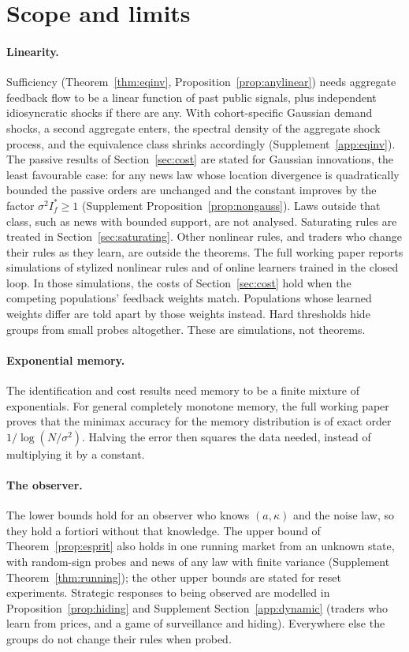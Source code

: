 \section{Scope and limits}\label{sec:scope}

\paragraph{Linearity.} Sufficiency (Theorem~\ref{thm:eqinv}, Proposition~\ref{prop:anylinear}) needs aggregate feedback flow to be a linear function of past public signals, plus independent idiosyncratic shocks if there are any. With cohort-specific Gaussian demand shocks, a second aggregate enters, the spectral density of the aggregate shock process, and the equivalence class shrinks accordingly (Supplement~\ref{app:eqinv}). The passive results of Section~\ref{sec:cost} are stated for Gaussian innovations, the least favourable case: for any news law whose location divergence is quadratically bounded the passive orders are unchanged and the constant improves by the factor $\sigma^2I^*_f\ge1$ (Supplement Proposition~\ref{prop:nongauss}). Laws outside that class, such as news with bounded support, are not analysed. Saturating rules are treated in Section~\ref{sec:saturating}. Other nonlinear rules, and traders who change their rules as they learn, are outside the theorems. The full working paper reports simulations of stylized nonlinear rules and of online learners trained in the closed loop. In those simulations, the costs of Section~\ref{sec:cost} hold when the competing populations' feedback weights match. Populations whose learned weights differ are told apart by those weights instead. Hard thresholds hide groups from small probes altogether. These are simulations, not theorems.

\paragraph{Exponential memory.} The identification and cost results need memory to be a finite mixture of exponentials. For general completely monotone memory, the full working paper proves that the minimax accuracy for the memory distribution is of exact order $1/\log(N/\sigma^2)$. Halving the error then squares the data needed, instead of multiplying it by a constant.

\paragraph{The observer.} The lower bounds hold for an observer who knows $(a,\kappa)$ and the noise law, so they hold a fortiori without that knowledge. The upper bound of Theorem~\ref{prop:esprit} also holds in one running market from an unknown state, with random-sign probes and news of any law with finite variance (Supplement Theorem~\ref{thm:running}); the other upper bounds are stated for reset experiments. Strategic responses to being observed are modelled in Proposition~\ref{prop:hiding} and Supplement Section~\ref{app:dynamic} (traders who learn from prices, and a game of surveillance and hiding). Everywhere else the groups do not change their rules when probed.


